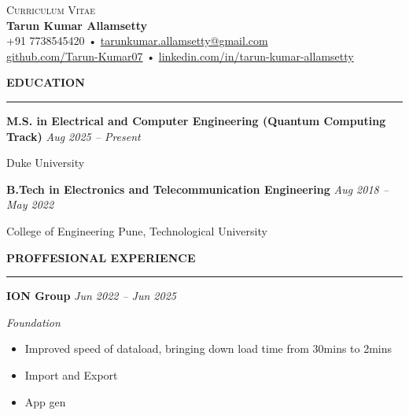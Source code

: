\documentclass[a4paper,10pt]{article}
\newcommand{\cvHeaderOne}[1]{%
  \vspace*{1.5em}%
  {\noindent\large\textbf{\MakeUppercase{#1}}\par}%
  \noindent\rule{\linewidth}{0.4pt}%
  \vspace*{0.5em}%
}
\newcommand{\cvHeaderTwo}[2]{%
  \vspace{0.8em}%
  \noindent\textbf{\normalsize #1} \hfill \textit{#2}\par%
}
\newcommand{\cvHeaderThree}[1]{%
  \noindent\textit{#1}%
}
\newcommand{\cvItem}[1]{%
  \noindent\parbox{\dimexpr\linewidth}{#1}\par%
}
\newenvironment{cvItemList}{%
  \begin{itemize}%
    \setlength{\itemsep}{0.1em}%
    \setlength{\topsep}{0em}%
    \setlength{\partopsep}{0em}%
    \setlength{\parsep}{0em}%
    \setlength{\parskip}{0em}%
}{%
  \end{itemize}%
}
\begin{document}
\begin{center}
  {\large \textsc{Curriculum Vitae}} \\[0.3em]
  {\LARGE \textbf{Tarun Kumar Allamsetty}} \\[0.75em]
  \small
  +91 7738545420 \quad • \quad \href{mailto:tarunkumar.allamsetty@gmail.com}{tarunkumar.allamsetty@gmail.com} \\[0.2em]
  \href{https://github.com/Tarun-Kumar07}{github.com/Tarun-Kumar07} \quad • \quad
  \href{https://www.linkedin.com/in/tarun-kumar-allamsetty}{linkedin.com/in/tarun-kumar-allamsetty}
\end{center}

\vspace{2em}

\cvHeaderOne{Education}

\cvHeaderTwo{M.S. in Electrical and Computer Engineering (Quantum Computing Track)}{Aug 2025 -- Present}
\cvItem{Duke University}

\cvHeaderTwo{B.Tech in Electronics and Telecommunication Engineering}{Aug 2018 -- May 2022}
\cvItem{College of Engineering Pune, Technological University}


\cvHeaderOne{Proffesional Experience}

\cvHeaderTwo{ION Group}{Jun 2022 -- Jun 2025}

\cvHeaderThree{Foundation}

\begin{cvItemList}
  \item Improved speed of dataload, bringing down load time from 30mins to 2mins  
  \item Import and Export 
  \item App gen 
\end{cvItemList}
\end{document}
